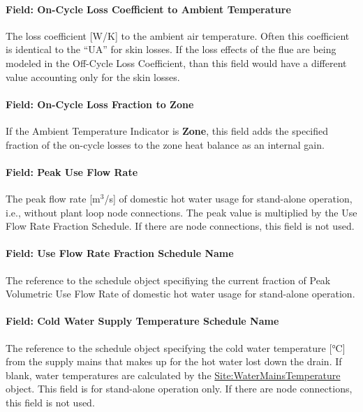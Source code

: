 \paragraph{Field: On-Cycle Loss Coefficient to Ambient Temperature}\label{field-on-cycle-loss-coefficient-to-ambient-temperature}

The loss coefficient {[}W/K{]} to the ambient air temperature. Often this coefficient is identical to the ``UA'' for skin losses. If the loss effects of the flue are being modeled in the Off-Cycle Loss Coefficient, than this field would have a different value accounting only for the skin losses.

\paragraph{Field: On-Cycle Loss Fraction to Zone}\label{field-on-cycle-loss-fraction-to-zone}

If the Ambient Temperature Indicator is \textbf{Zone}, this field adds the specified fraction of the on-cycle losses to the zone heat balance as an internal gain.

\paragraph{Field: Peak Use Flow Rate}\label{field-peak-use-flow-rate}

The peak flow rate {[}m\(^{3}\)/s{]} of domestic hot water usage for stand-alone operation, i.e., without plant loop node connections. The peak value is multiplied by the Use Flow Rate Fraction Schedule. If there are node connections, this field is not used.

\paragraph{Field: Use Flow Rate Fraction Schedule Name}\label{field-use-flow-rate-fraction-schedule-name}

The reference to the schedule object specifiying the current fraction of Peak Volumetric Use Flow Rate of domestic hot water usage for stand-alone operation.

\paragraph{Field: Cold Water Supply Temperature Schedule Name}\label{field-cold-water-supply-temperature-schedule-name}

The reference to the schedule object specifying the cold water temperature {[}°C{]} from the supply mains that makes up for the hot water lost down the drain. If blank, water temperatures are calculated by the \hyperref[sitewatermainstemperature]{Site:WaterMainsTemperature} object. This field is for stand-alone operation only. If there are node connections, this field is not used.

